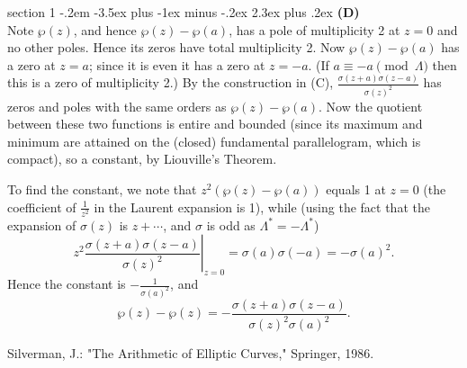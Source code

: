 \documentclass[12pt]{article}
\makeatletter
\theoremstyle{norm}
\newcommand{\rc}[1]{\frac{1}{#1}}
\newcommand{\la}[0]{\lambda}
\newcommand{\La}[0]{\Lambda}
\newcommand{\pa}[1]{\left( {#1} \right)}
\newcommand{\subprob}[1]{\noindent\textbf{#1}\\}
\newenvironment{problem}{\@startsection
       {section}
       {1}
       {-.2em}
       {-3.5ex plus -1ex minus -.2ex}
       {2.3ex plus .2ex}
       {\pagebreak[3]%
       \large\bf\noindent{Problem }
       }
       }
       {%
       }
\makeatother
\begin{document}
\begin{problem} {\it }
\subprob{(D)}
Note $\wp(z)$, and hence $\wp(z)-\wp(a)$, has a pole of multiplicity 2 at $z=0$ and no other poles. Hence its zeros have total multiplicity 2. Now $\wp(z)-\wp(a)$ has a zero at $z=a$; since it is even it has a zero at $z=-a$. (If $a\equiv -a\pmod{\La}$ then this is a zero of multiplicity 2.) By the construction in (C), $\frac{\sigma(z+a)\sigma(z-a)}{\sigma(z)^2}$ has zeros and poles with the same orders as $\wp(z)-\wp(a)$. Now the quotient between these two functions is entire and bounded (since its maximum and minimum are attained on the (closed) fundamental parallelogram, which is compact), so a constant, by Liouville's Theorem.

To find the constant, we note that $z^2(\wp(z)-\wp(a))$ equals 1 at $z=0$ (the coefficient of $\rc{z^2}$ in the Laurent expansion is 1), while (using the fact that the expansion of $\sigma(z)$ is $z+\cdots$, and $\sigma$ is odd as $\La^*=-\La^*$)
\[z^2\left.\frac{\sigma(z+a)\sigma(z-a)}{\sigma(z)^2}\right|_{z=0}
=
\sigma(a)\sigma(-a)=-\sigma(a)^2.
\]
Hence the constant is $-\rc{\sigma(a)^2}$, and
\[
\wp(z)-\wp(z)=-\frac{\sigma(z+a)\sigma(z-a)}{\sigma(z)^2\sigma(a)^2}.
\]

\end{problem}
\begin{thebibliography}{9}
 Silverman, J.: "The Arithmetic of Elliptic Curves," Springer, 1986.
\end{thebibliography}
\end{document}
